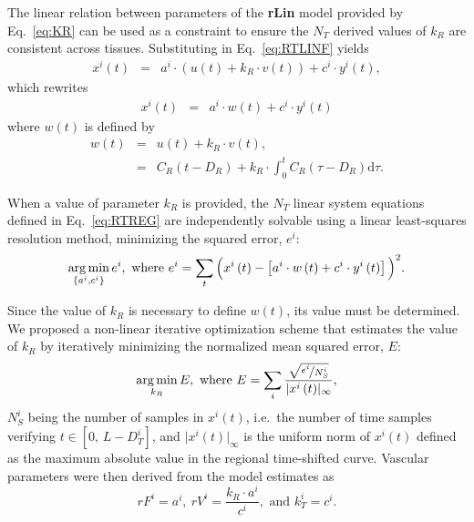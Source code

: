 The linear relation between parameters of the \textbf{rLin} model provided by Eq.~\ref{eq:KR} can be used as a constraint to ensure the $N_T$ derived values of $k_R$ are consistent across tissues.
Substituting in Eq.~\ref{eq:RTLINF} yields 
\begin{equation}
\begin{array}{rcl}
x^i\left(t\right) &=& a^i\cdot\left( u\left(t\right) + k_R\cdot v\left(t\right)\right) + c^i\cdot y^i\left(t\right),
\end{array}
\label{eq:RTREG}
\end{equation}
which rewrites 
\begin{equation}
\begin{array}{rcl}
x^i\left(t\right) &=& a^i\cdot w\left(t\right) + c^i\cdot y^i\left(t\right)
\end{array}
\label{eq:RTREG2}
\end{equation}
where $w\left(t\right)$ is defined by
\begin{equation}
\begin{array}{rcl}
w\left(t\right) &=& u\left(t\right) + k_R \cdot v\left(t\right),\\
&=& C_{R}\left(t-D_R\right) + k_R \cdot \int_0^t C_{R} \left(\tau - D_{R}\right) \mathrm d\tau.
\end{array}
\label{eq:RTREG3}
\end{equation}

When a value of parameter $k_R$ is provided, the $N_T$ linear system equations defined in Eq.~\ref{eq:RTREG} are independently solvable using a linear least-squares resolution method, minimizing the squared error, $e^i$:
\begin{equation}
\operatorname*{arg\,min}_{\left\lbrace a^i, c^i \right\rbrace} e^i, \textrm{ where } e^i = \sum_{t} \Big( x^i\left(t\right) - \left[a^i\cdot w\left(t\right) + c^i\cdot y^i\left(t\right) \right] \Big)^2.
\end{equation}

Since the value of $k_R$ is necessary to define $w\left(t\right)$, its value must be determined.
We proposed a non-linear iterative optimization scheme that estimates the value of $k_R$ by iteratively minimizing the normalized mean squared error, $E$:
\begin{equation}
\operatorname*{arg\,min}_{k_R} E, \textrm{ where } E = \sum_i\frac{\sqrt{\nicefrac{e^i}{N_S^i} }}{\lvert x^i\left(t\right) \rvert_{\infty}},
\end{equation}
$N_S^i$ being the number of samples in $x^i(t)$, i.e.~the number of time samples verifying $t \in \left[0,\,L-D_T^i\right]$, and $\lvert x^i\left(t\right) \rvert_{\infty}$ is the uniform norm of $x^i\left(t\right)$ defined as the maximum absolute value in the regional time-shifted curve.
Vascular parameters were then derived from the model estimates as 
\begin{equation}
rF^i = a^i,~rV^i = \frac{k_R \cdot a^i}{c^i}, \textrm{ and } k_T^i = c^i.
\end{equation}

